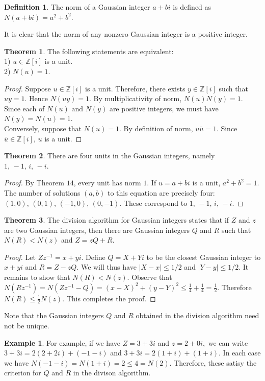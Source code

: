 \documentclass[11pt]{report}
\theoremstyle{plain}
\theoremstyle{definition}
\newtheorem{defn}{Definition}
\newtheorem{exmp}{Example} %
\newtheorem{theorem}{Theorem}
\begin{document}
\begin{defn}
	The norm of a Gaussian integer $ a+bi $ is defined as $ N(a+bi) = a^2 + b^2.$
\end{defn}
It is clear that the norm of any nonzero Gaussian integer is a positive integer.
\begin{theorem}
	The following statements are equivalent: \\ 
	1) $ u \in \mathbb{Z}[i]$ is a unit.\\
	2) $N(u) = 1. $	 
\end{theorem}
\begin{proof}
	Suppose $ u \in \mathbb{Z}[i] $  is a unit. Therefore, there exists $ y \in \mathbb{Z}[i] $ such that $ uy = 1. $ Hence $ N(uy)=1. $ By multiplicativity of norm, $ N(u)N(y)=1. $ Since each of $ N(u) \text{ and }N(y) $ are positive integers, we must have $ N(y)=N(u)=1. $\\
	Conversely, suppose that $ N(u)=1 $. By definition of norm, $ u\bar{u}=1 $. Since $\bar{u} \in  \mathbb{Z}[i] $, $ u $ is a unit.
\end{proof}
\begin{theorem}
	There are four units in the Gaussian integers, namely $ 1,\, -1,\, i,\, -i.$
\end{theorem}
\begin{proof}
	By Theorem $ 14 $, every unit has norm $ 1 $. If $ u = a+bi $ is a unit, $ a^2 + b^2 = 1 $. The number of solutions $ (a,b) $ to this equation are precisely four: $ (1,0),\,(0,1),\,(-1,0),\,(0,-1). $ These correspond to $ 1,\, -1,\, i,\, -i.$
\end{proof}
\begin{theorem}
		The division algorithm for Gaussian integers states that if $ Z $ and $ z $ are two Gaussian integers, then there are Gaussian integers $ Q $ and $ R $ such that $ N(R)<N(z) $ and $ Z=zQ+R $.
		\begin{proof}
			Let $ Zz^{-1} = x + yi$. Define $ Q = X + Yi $ to be the closest Gaussian integer to $ x+yi $ and $ R = Z-zQ $. We will thus have $ |X-x|\leq 1/2 $ and $ |Y-y|\leq 1/2 $. It remains to show that $ N(R)<N(z) $. Observe that $ N(Rz^{-1}) = N(Zz^{-1}-Q) = (x-X)^2+(y-Y)^2 \leq \frac{1}{4} + \frac{1}{4} = \frac{1}{2}. $
			Therefore $ N(R)\leq \frac{1}{2} N(z) $. This completes the proof.
			
		\end{proof}
	Note that the Gaussian integers $ Q $ and $ R $ obtained in the division algorithm need not be unique.
	\begin{exmp}
 For example, if we have $ Z = 3+3i$ and $z = 2+0i,$ we can write $ 3+3i = 2(2+2i) + (-1-i) $ and $ 3+3i = 2(1+i)+(1+i) $. In each case we have $ N(-1-i) = N(1+i) = 2 \leq 4 = N(2) $. Therefore, these satisy the criterion for $ Q $ and $ R $ in the divison algorithm. 

	\end{exmp}
	\end{theorem}
\end{document}
